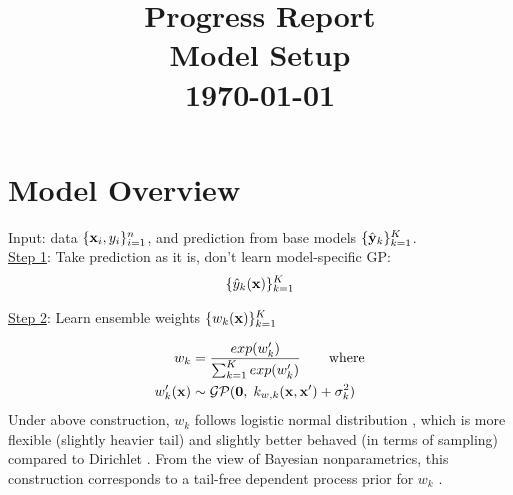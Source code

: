 \documentclass[11pt]{article}
\theoremstyle{definition}
\begin{document}

\title{Progress Report \\ Model Setup \\ \today \vspace{-1ex}}

\pretitle{\begin{flushright}\normalsize}
\posttitle{\par\end{flushright}}
\author{}
\date{}
\vspace{-10em}
\maketitle
\vspace{-5em}

\tableofcontents 

\newpage
\section{\textbf{Model Overview}}
Input: data $\{{\bf x}_i, y_i\}_{i=1}^n$, and prediction from base models $\{\hat{{\bf y}}_k\}_{k=1}^K$.\\

\underline{Step 1}: Take prediction as it is, don't learn model-specific GP:
\begin{alignat*}{3}
\{\hat{y}_k({\bf x})\}_{k=1}^K
\end{alignat*}

\underline{Step 2}: Learn ensemble weights $\{w_k({\bf x})\}_{k=1}^K$

\begin{alignat*}{3}
w_k &= \frac{exp(w'_k)}{\sum_{k=1}^K exp(w'_k)} \qquad 
\mbox{where}\\
w'_k({\bf x}) & \sim {\cal G}{\cal P}({\bf 0}, \; k_{w,k}({\bf x}, {\bf x}') + \sigma_k^2 )
\end{alignat*}
Under above construction, $w_k$ follows logistic normal distribution \citep{aitchison_logistic-normal_1980}, which is more flexible (slightly heavier tail) and slightly better behaved (in terms of sampling) compared to Dirichlet . From the view of Bayesian nonparametrics, this construction corresponds to a tail-free dependent process prior for $w_k$ \citep{jara_class_2011}.
\end{document}

